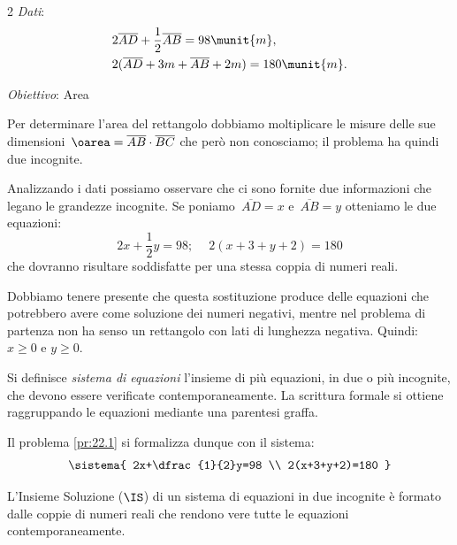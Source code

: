 \begin{soluzione}
\begin{htmulticols}{2}
\emph{Dati}:
\begin{align*}
&2\overline{AD}+\frac{1}{2}\overline{AB}=98\munit{m},\\
&2(\overline{AD}+3m+\overline{AB}+2m)=180\munit{m}.
\end{align*}

\emph{Obiettivo}: Area

{}
\end{htmulticols}

Per determinare l'area del rettangolo dobbiamo moltiplicare le misure 
delle sue dimensioni~\(\oarea=\overline{AB}\cdot\overline{BC}\)
che però non conosciamo; il problema ha quindi due incognite.

Analizzando i dati possiamo osservare che ci sono fornite due
informazioni che legano le grandezze incognite. 
Se poniamo~\(\overline{AD}=x\) e~\(\overline{AB}=y\)
otteniamo le due equazioni:
\[2x+\frac{1}{2}y=98;\quad~2(x+3+y+2)=180\]
che dovranno risultare soddisfatte per una stessa coppia di numeri
reali.
\end{soluzione}

\begin{osservazione}{}{}
Dobbiamo tenere presente che questa sostituzione produce delle equazioni 
che potrebbero avere come soluzione dei numeri negativi, mentre nel 
problema di partenza non ha senso un rettangolo con lati di lunghezza 
negativa.
Quindi:~\(x \geqslant 0 \text{ e } y \geqslant 0\).
\end{osservazione}

\begin{definizione}{}{}
Si definisce \emph{sistema di equazioni} l'insieme di più equazioni, 
in due o più incognite, che devono essere verificate contemporaneamente. 
La scrittura formale si ottiene raggruppando le equazioni mediante una 
parentesi graffa.
\end{definizione}

\begin{soluzione}
Il problema \ref{pr:22.1} si formalizza dunque con il sistema:\\[-.5em]
\[\sistema{
 2x+\dfrac{1}{2}y=98 \\
 2(x+3+y+2)=180
}\]
\end{soluzione}

\begin{definizione}{}{}
L'Insieme Soluzione (\(\IS\)) di un sistema di equazioni in
due incognite è formato dalle coppie di numeri reali
che rendono vere tutte le equazioni contemporaneamente.
\end{definizione}

